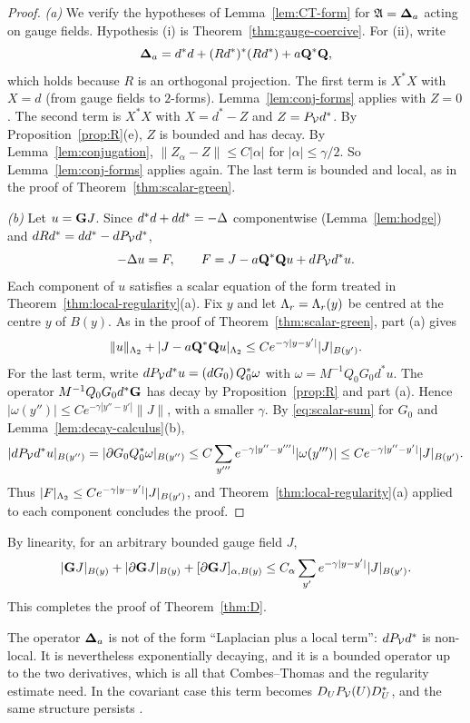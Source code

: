 \begin{proof}
\emph{(a)} We verify the hypotheses of Lemma~\ref{lem:CT-form} for $\mathfrak A=\boldsymbol{\Delta}_a$ acting on gauge fields. Hypothesis (i) is Theorem~\ref{thm:gauge-coercive}. For (ii), write
\[
\boldsymbol{\Delta}_a=d^*d+(Rd^*)^*(Rd^*)+a\mathbf Q^*\mathbf Q,
\]
which holds because $R$ is an orthogonal projection. The first term is $X^*X$ with $X=d$ (from gauge fields to $2$-forms). Lemma~\ref{lem:conj-forms} applies with $Z=0$. The second term is $X^*X$ with $X=d^*-Z$ and $Z=P_\mathcal V d^*$. By Proposition~\ref{prop:R}(e), $Z$ is bounded and has decay. By Lemma~\ref{lem:conjugation}, $\|Z_\alpha-Z\|\le C|\alpha|$ for $|\alpha|\le\gamma/2$. So Lemma~\ref{lem:conj-forms} applies again. The last term is bounded and local, as in the proof of Theorem~\ref{thm:scalar-green}.

\emph{(b)} Let $u=\mathbf G J$. Since $d^*d+dd^*=-\Delta$ componentwise (Lemma~\ref{lem:hodge}) and $dRd^*=dd^*-dP_\mathcal V d^*$,
\[
-\Delta u=F,\qquad F=J-a\mathbf Q^*\mathbf Q u+dP_\mathcal V d^*u .
\]
Each component of $u$ satisfies a scalar equation of the form treated in Theorem~\ref{thm:local-regularity}(a). Fix $y$ and let $\Lambda_r=\Lambda_r(y)$ be centred at the centre $y$ of $B(y)$. As in the proof of Theorem~\ref{thm:scalar-green}, part (a) gives
\[
\|u\|_{\Lambda_2}+|J-a\mathbf Q^*\mathbf Q u|_{\Lambda_2}\le Ce^{-\gamma|y-y'|}|J|_{B(y')} .
\]
For the last term, write $dP_\mathcal V d^*u=(dG_0)\,Q_0^*\omega$ with $\omega=M^{-1}Q_0G_0d^*u$. The operator $M^{-1}Q_0G_0d^*\mathbf G$ has decay by Proposition~\ref{prop:R} and part (a). Hence $|\omega(y'')|\le Ce^{-\gamma|y''-y'|}\|J\|$, with a smaller $\gamma$. By \eqref{eq:scalar-sum} for $G_0$ and Lemma~\ref{lem:decay-calculus}(b),
\[
|dP_\mathcal V d^*u|_{B(y'')}=|\partial G_0Q_0^*\omega|_{B(y'')}\le C\sum_{y'''}e^{-\gamma|y''-y'''|}|\omega(y''')|\le Ce^{-\gamma|y''-y'|}|J|_{B(y')} .
\]
Thus $|F|_{\Lambda_2}\le Ce^{-\gamma|y-y'|}|J|_{B(y')}$, and Theorem~\ref{thm:local-regularity}(a) applied to each component concludes the proof.
\end{proof}

By linearity, for an arbitrary bounded gauge field $J$,
\begin{equation}\label{eq:gauge-sum}
|\mathbf G J|_{B(y)}+|\partial\mathbf G J|_{B(y)}+[\partial\mathbf G J]_{\alpha,B(y)}\le C_\alpha\sum_{y'}e^{-\gamma|y-y'|}|J|_{B(y')} .
\end{equation}
This completes the proof of Theorem~\ref{thm:D}.

\begin{remark}\label{x:10.2}
The operator $\boldsymbol{\Delta}_a$ is not of the form ``Laplacian plus a local term'': $dP_\mathcal V d^*$ is non-local. It is nevertheless exponentially decaying, and it is a bounded operator up to the two derivatives, which is all that Combes--Thomas and the regularity estimate need. In the covariant case this term becomes $D_UP_\mathcal V(U)D_U^*$, and the same structure persists \cite{BalBackground}.
\end{remark}
